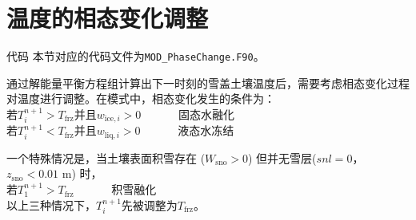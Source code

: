 \section{温度的相态变化调整}\label{sec:温度的相态变化调整}

\begin{mymdframed}{代码}
  本节对应的代码文件为\texttt{MOD\_PhaseChange.F90}。
\end{mymdframed}

通过解能量平衡方程组计算出下一时刻的雪盖土壤温度后，需要考虑相态变化过程对温度进行调整。在模式中，相态变化发生的条件为：\\
若$T_i^{n+1}>T_{\mathrm {frz}} $并且$w_{\mathrm{ice},i}>0$ \ \   \ \  \ \   固态水融化\\
若$T_i^{n+1}<T_{\mathrm {frz}} $并且$w_{\mathrm{liq},i}>0$  \ \   \ \  \ \         液态水冻结

一个特殊情况是，当土壤表面积雪存在 ($W_{\mathrm{sno}}>0$) 但并无雪层($snl=0$，$z_{\mathrm{sno}}<0.01$ \unit{m}) 时，\\
若$T_1^{n+1}>T_{\mathrm {frz}} $      \ \   \ \  \ \                 积雪融化\\
%
以上三种情况下，$T_i^{n+1}$先被调整为$T_{\mathrm {frz}} $。


